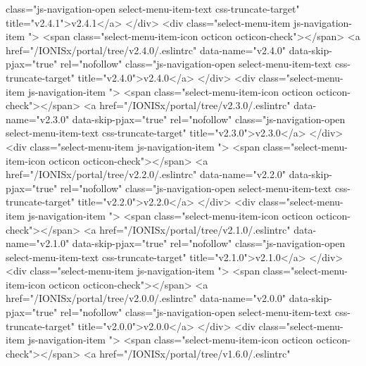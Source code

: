                  class="js-navigation-open select-menu-item-text css-truncate-target"
                 title="v2.4.1">v2.4.1</a>
            </div>
            <div class="select-menu-item js-navigation-item ">
              <span class="select-menu-item-icon octicon octicon-check"></span>
              <a href="/IONISx/portal/tree/v2.4.0/.eslintrc"
                 data-name="v2.4.0"
                 data-skip-pjax="true"
                 rel="nofollow"
                 class="js-navigation-open select-menu-item-text css-truncate-target"
                 title="v2.4.0">v2.4.0</a>
            </div>
            <div class="select-menu-item js-navigation-item ">
              <span class="select-menu-item-icon octicon octicon-check"></span>
              <a href="/IONISx/portal/tree/v2.3.0/.eslintrc"
                 data-name="v2.3.0"
                 data-skip-pjax="true"
                 rel="nofollow"
                 class="js-navigation-open select-menu-item-text css-truncate-target"
                 title="v2.3.0">v2.3.0</a>
            </div>
            <div class="select-menu-item js-navigation-item ">
              <span class="select-menu-item-icon octicon octicon-check"></span>
              <a href="/IONISx/portal/tree/v2.2.0/.eslintrc"
                 data-name="v2.2.0"
                 data-skip-pjax="true"
                 rel="nofollow"
                 class="js-navigation-open select-menu-item-text css-truncate-target"
                 title="v2.2.0">v2.2.0</a>
            </div>
            <div class="select-menu-item js-navigation-item ">
              <span class="select-menu-item-icon octicon octicon-check"></span>
              <a href="/IONISx/portal/tree/v2.1.0/.eslintrc"
                 data-name="v2.1.0"
                 data-skip-pjax="true"
                 rel="nofollow"
                 class="js-navigation-open select-menu-item-text css-truncate-target"
                 title="v2.1.0">v2.1.0</a>
            </div>
            <div class="select-menu-item js-navigation-item ">
              <span class="select-menu-item-icon octicon octicon-check"></span>
              <a href="/IONISx/portal/tree/v2.0.0/.eslintrc"
                 data-name="v2.0.0"
                 data-skip-pjax="true"
                 rel="nofollow"
                 class="js-navigation-open select-menu-item-text css-truncate-target"
                 title="v2.0.0">v2.0.0</a>
            </div>
            <div class="select-menu-item js-navigation-item ">
              <span class="select-menu-item-icon octicon octicon-check"></span>
              <a href="/IONISx/portal/tree/v1.6.0/.eslintrc"

